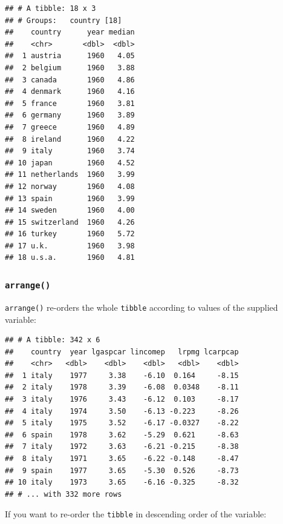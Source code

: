 \documentclass[]{gitbook}
\newenvironment{Shaded}{\begin{snugshade}}{\end{snugshade}}
\newcommand{\KeywordTok}[1]{\textcolor[rgb]{0.13,0.29,0.53}{\textbf{#1}}}
\newcommand{\NormalTok}[1]{#1}
\newcommand{\OperatorTok}[1]{\textcolor[rgb]{0.81,0.36,0.00}{\textbf{#1}}}
\newcommand{\StringTok}[1]{\textcolor[rgb]{0.31,0.60,0.02}{#1}}
\theoremstyle{definition}
\theoremstyle{definition}
\theoremstyle{definition}
\theoremstyle{remark}
\begin{document}
\begin{verbatim}
## # A tibble: 18 x 3
## # Groups:   country [18]
##    country      year median
##    <chr>       <dbl>  <dbl>
##  1 austria      1960   4.05
##  2 belgium      1960   3.88
##  3 canada       1960   4.86
##  4 denmark      1960   4.16
##  5 france       1960   3.81
##  6 germany      1960   3.89
##  7 greece       1960   4.89
##  8 ireland      1960   4.22
##  9 italy        1960   3.74
## 10 japan        1960   4.52
## 11 netherlands  1960   3.99
## 12 norway       1960   4.08
## 13 spain        1960   3.99
## 14 sweden       1960   4.00
## 15 switzerland  1960   4.26
## 16 turkey       1960   5.72
## 17 u.k.         1960   3.98
## 18 u.s.a.       1960   4.81
\end{verbatim}

\hypertarget{arrange}{%
\subsubsection{\texorpdfstring{\texttt{arrange()}}{arrange()}}\label{arrange}}

\texttt{arrange()} re-orders the whole \texttt{tibble} according to
values of the supplied variable:

\begin{Shaded}
\end{Shaded}

\begin{verbatim}
## # A tibble: 342 x 6
##    country  year lgaspcar lincomep   lrpmg lcarpcap
##    <chr>   <dbl>    <dbl>    <dbl>   <dbl>    <dbl>
##  1 italy    1977     3.38    -6.10  0.164     -8.15
##  2 italy    1978     3.39    -6.08  0.0348    -8.11
##  3 italy    1976     3.43    -6.12  0.103     -8.17
##  4 italy    1974     3.50    -6.13 -0.223     -8.26
##  5 italy    1975     3.52    -6.17 -0.0327    -8.22
##  6 spain    1978     3.62    -5.29  0.621     -8.63
##  7 italy    1972     3.63    -6.21 -0.215     -8.38
##  8 italy    1971     3.65    -6.22 -0.148     -8.47
##  9 spain    1977     3.65    -5.30  0.526     -8.73
## 10 italy    1973     3.65    -6.16 -0.325     -8.32
## # ... with 332 more rows
\end{verbatim}

If you want to re-order the \texttt{tibble} in descending order of the
variable:
\end{document}
